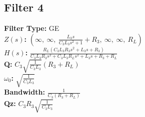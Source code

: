 \documentclass{article}
\begin{document}
\subsection*{Filter 4}
\textbf{Filter Type:} GE \\ 
\textbf{$Z(s)$:} $\left( \infty, \  \infty, \  \frac{L_{3} s}{C_{3} L_{3} s^{2} + 1} + R_{3}, \  \infty, \  \infty, \  R_{L}\right)$ \\ 
\textbf{$H(s)$:} $\frac{R_{L} \left(C_{3} L_{3} R_{3} s^{2} + L_{3} s + R_{3}\right)}{C_{3} L_{3} R_{3} s^{2} + C_{3} L_{3} R_{L} s^{2} + L_{3} s + R_{3} + R_{L}}$ \\ 
\textbf{Q:} $C_{3} \sqrt{\frac{1}{C_{3} L_{3}}} \left(R_{3} + R_{L}\right)$ \\ 
\textbf{$\omega_0$:} $\sqrt{\frac{1}{C_{3} L_{3}}}$ \\ 
\textbf{Bandwidth:} $\frac{1}{C_{3} \left(R_{3} + R_{L}\right)}$ \\ 
\textbf{Qz:} $C_{3} R_{3} \sqrt{\frac{1}{C_{3} L_{3}}}$ \\ 
\end{document}
